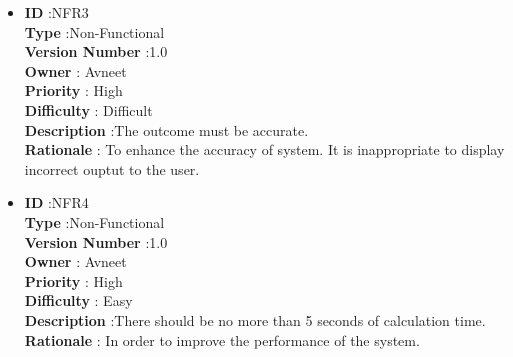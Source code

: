 \documentclass[a4paper,12pt]{report}
\begin{document}
\begin{itemize}
	\item
    \textbf{ID } \hspace{3cm} :NFR3  \\
	\textbf{Type } \hspace{2.4cm}  :Non-Functional\\
	\textbf{Version Number} \hspace{0.3cm} :1.0  \\
	\textbf{Owner } \hspace{1.98cm} : Avneet \\
	\textbf{Priority } \hspace{1.75cm} : High\\
	\textbf{Difficulty } \hspace{1.5cm} : Difficult\\
	\textbf{Description }\hspace{1.2cm} :The outcome must be accurate.\\
	\textbf{Rationale }\hspace{1.6cm} :  To enhance the accuracy of system. It is inappropriate to display incorrect ouptut to the user.\\

	\item
    \textbf{ID } \hspace{3cm} :NFR4  \\
	\textbf{Type } \hspace{2.4cm}  :Non-Functional\\
	\textbf{Version Number} \hspace{0.3cm} :1.0  \\
	\textbf{Owner } \hspace{1.98cm} : Avneet \\
	\textbf{Priority } \hspace{1.75cm} : High\\
	\textbf{Difficulty } \hspace{1.5cm} : Easy\\
	\textbf{Description }\hspace{1.2cm} :There should be no more than 5 seconds of calculation time.\\
	\textbf{Rationale }\hspace{1.6cm} :  In order to improve the performance of the system.\\


\end{itemize}
\end{document}
